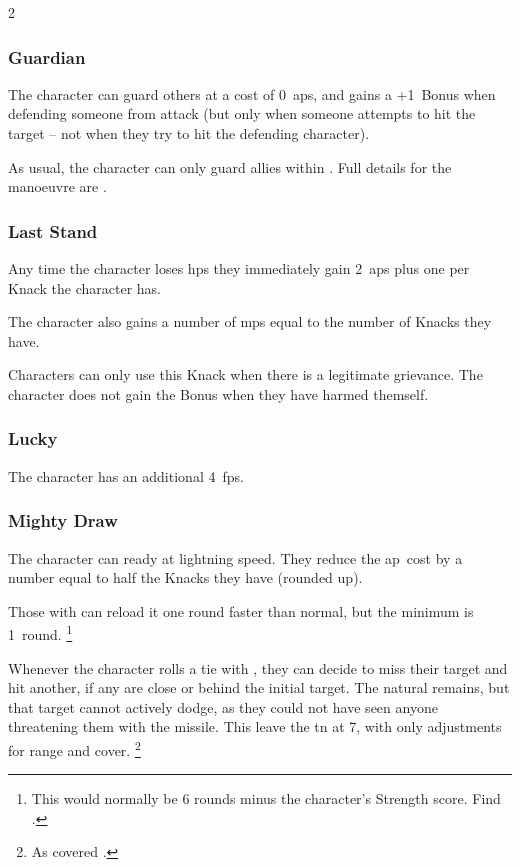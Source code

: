 \begin{multicols}{2}
\subsubsection{Guardian}

The character can guard others at a cost of 0~\glspl{ap}, and gains a +1~Bonus when defending someone from attack (but only when someone attempts to hit the target -- not when they try to hit the defending character).

As usual, the character can only guard allies within .
Full details for the manoeuvre are .

\subsubsection{Last Stand}

Any time the character loses \glspl{hp} they immediately gain 2~\glspl{ap} plus one per Knack the character has.

The character also gains a number of \glspl{mp} equal to the number of Knacks they have.

Characters can only use this Knack when there is a legitimate grievance.
The character does not gain the Bonus when they have harmed themself.

\subsubsection{Lucky}

The character has an additional 4~\glspl{fp}.

\subsubsection{Mighty Draw}

The character can ready  at lightning speed.
They reduce the \gls{ap}~cost by a number equal to half the Knacks they have (rounded up).

Those with  can reload it one round faster than normal, but the minimum is 1~round.%
\footnote{This would normally be 6 rounds minus the character's Strength score.  Find  .}

Whenever the character rolls a tie with , they can decide to
miss their target and hit another, if any are close or behind the initial
target.
The \gls{natural} remains, but that target cannot actively dodge, as they could
not have seen anyone threatening them with the missile.
This leave the \gls{tn} at 7, with only adjustments for range and cover.%
\footnote{As covered .}


\end{multicols}
